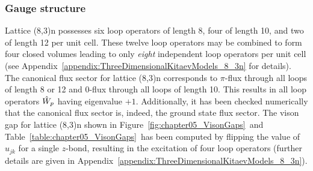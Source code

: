 %
%
\subsubsection{Gauge structure}
%
%
Lattice (8,3)n possesses six loop operators of length 8, four of length 10, and two of length 12 per unit cell.
These twelve loop operators may be combined to form four closed volumes leading to only \textit{eight} independent loop operators per unit cell (see Appendix~\ref{appendix:ThreeDimensionalKitaevModels_8_3n} for details).
The canonical flux sector for lattice (8,3)n corresponds to $\pi$-flux through all loops of length 8 or 12 and $0$-flux through all loops of length 10.
This results in all loop operators $\hat{W}_p$ having eigenvalue $+1$.
Additionally, it has been checked numerically that the canonical flux sector is, indeed, the ground state flux sector.
The vison gap for lattice (8,3)n shown in Figure~\ref{fig:chapter05_VisonGaps}~and Table~\ref{table:chapter05_VisonGaps}~has been computed by flipping the value of $u_{jk}$ for a single $z$-bond, resulting in the excitation of four loop operators (further details are given in Appendix~\ref{appendix:ThreeDimensionalKitaevModels_8_3n}).


%
